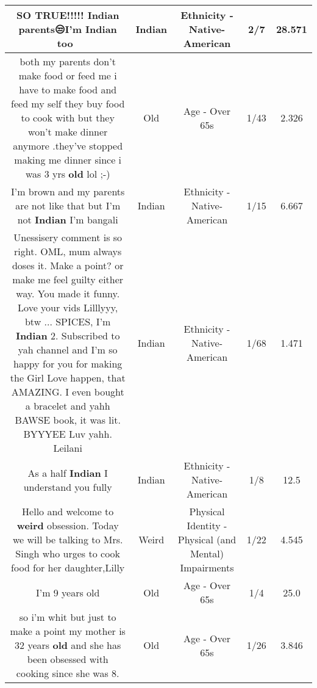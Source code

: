 \documentclass[11pt]{article}
\newlength\mylength
\begin{document}
\begin{center}
\begin{longtable}{|C{.65\mylength}|C{.30\mylength}|C{.12\mylength}|C{.12\mylength}|C{.12\mylength}|}
  \small SO TRUE!!!!! \textbf{Indian} parents😒I'm \textbf{Indian} too🤪😂\normalsize   & Indian & Ethnicity - Native-American & 2/7 & 28.571 \\  \hline
  \small both my parents don't make food or feed me i have to make food and feed my self they buy food to cook with but they won't make dinner anymore .they've stopped making me dinner since i was 3 yrs \textbf{old} lol ;-)\normalsize   & Old & Age - Over 65s & 1/43 & 2.326 \\  \hline
  \small I'm brown and my parents are not like that but I'm not \textbf{Indian} I'm bangali\normalsize   & Indian & Ethnicity - Native-American & 1/15 & 6.667 \\  \hline
  \small Unessisery comment is so right. OML, mum always doses it. Make a point? or make me feel guilty either way. You made it funny. Love your vids Lilllyyy, btw ... SPICES, I'm \textbf{Indian} 2. Subscribed to yah channel and I'm so happy for you for making the Girl Love happen, that AMAZING. I even bought a bracelet and yahh BAWSE book, it was lit. BYYYEE Luv yahh. Leilani\normalsize   & Indian & Ethnicity - Native-American & 1/68 & 1.471 \\  \hline
  \small As a half \textbf{Indian} I understand you fully\normalsize   & Indian & Ethnicity - Native-American & 1/8 & 12.5 \\  \hline
  \small Hello and welcome to \textbf{weird} obsession. Today we will be talking to Mrs. Singh who urges to cook food for her daughter,Lilly\normalsize   & Weird & Physical Identity - Physical (and Mental) Impairments & 1/22 & 4.545 \\  \hline
  \small I'm 9 years old\normalsize   & Old & Age - Over 65s & 1/4 & 25.0 \\  \hline
  \small so i'm whit but just to make a point my mother is 32 years \textbf{old} and she has been obsessed with cooking since she was 8.\normalsize   & Old & Age - Over 65s & 1/26 & 3.846 \\  \hline

\end{longtable}
\end{center}
\end{document}
